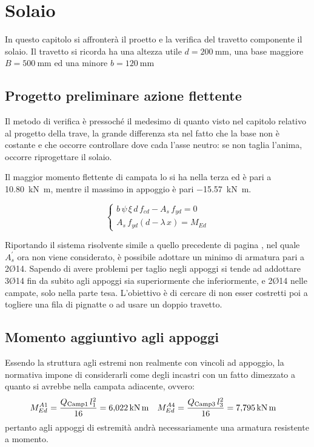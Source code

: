 \chapter{Solaio}
In questo capitolo si affronterà il proetto e la verifica del travetto componente il solaio.
Il travetto si ricorda ha una altezza utile $d=\SI{200}{\milli\metre}$, una base maggiore $B=\SI{500}{\milli\metre}$ ed una minore $b=\SI{120}{\milli\metre}$

\section{Progetto preliminare azione flettente}
Il metodo di verifica è pressoché il medesimo di quanto visto nel capitolo relativo al progetto della trave, la grande differenza sta nel fatto che la base non è costante e che occorre controllare dove cada l'asse neutro: se non taglia l'anima, occorre riprogettare il solaio.

Il maggior momento flettente di campata lo si ha nella terza ed è pari a \SI{10.80}{\kilo\newton\metre}, mentre il massimo in appoggio è pari \SI{-15.57}{\kilo\newton\metre}.

\begin{equation}
    \begin{cases}
      b \, \psi \, \xi \, d \, f_{cd} - A_s \, f_{yd} = 0 \\
      A_s \, f_{yd} \left(d - \lambda\,x\right) = M_{Ed}
    \end{cases}
  \end{equation}

Riportando il sistema risolvente simile a quello precedente di pagina \pageref{eq:sistemaSLU}, nel quale $A_s^\prime$ ora non viene considerato, è possibile adottare un minimo di armatura pari a 2Ø14. 
Sapendo di avere problemi per taglio negli appoggi si tende ad addottare 3Ø14 fin da subito agli appoggi sia superiormente che inferiormente, e 2Ø14 nelle campate, solo nella parte tesa. 
L'obiettivo è di cercare di non esser costretti poi a togliere una fila di pignatte o ad usare un doppio travetto.

\section{Momento aggiuntivo agli appoggi}
Essendo la struttura agli estremi non realmente con vincoli ad appoggio, la normativa impone di considerarli come degli incastri con un fatto dimezzato a quanto si avrebbe nella campata adiacente, ovvero:
\[
    M_{Ed}^{A1} = \frac{Q_\textup{Camp1} \, l_1^2 }{16} =  \SI{6.022}{\kilo\newton\metre} \quad M_{Ed}^{A4} = \frac{Q_\textup{Camp3} \, l_3^2 }{16} =  \SI{7.795}{\kilo\newton\metre} \quad
\]
pertanto agli appoggi di estremità andrà necessariamente una armatura resistente a momento.

